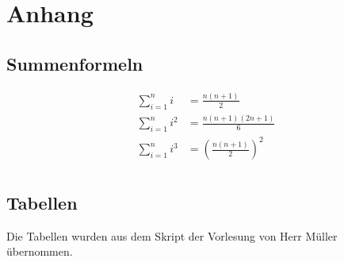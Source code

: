 \section{Anhang}
\subsection{Summenformeln}
\[ \begin{aligned}
  \sum_{i=1}^{n}i     & = \frac{n(n+1)}{2} \\
  \sum_{i=1}^{n}i^2   & = \frac{n(n+1)(2n+1)}{6} \\
  \sum_{i=1}^{n}i^3   & = \left(\frac{n(n+1)}{2}\right)^2 \\
\end{aligned} \]

\subsection{Tabellen}
Die Tabellen wurden aus dem Skript der Vorlesung von Herr Müller
übernommen.

